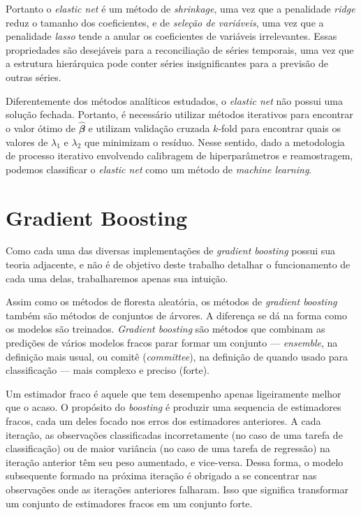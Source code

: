 \begin{apendicesenv}
Portanto o \emph{elastic net} é um método de \emph{shrinkage}, uma vez
que a penalidade \emph{ridge} reduz o tamanho dos coeficientes, e de
\emph{seleção de variáveis}, uma vez que a penalidade \emph{lasso} tende
a anular os coeficientes de variáveis irrelevantes. Essas propriedades
são desejáveis para a reconciliação de séries temporais, uma vez que a
estrutura hierárquica pode conter séries insignificantes para a previsão
de outras séries.

Diferentemente dos métodos analíticos estudados, o \emph{elastic net}
não possui uma solução fechada. Portanto, é necessário utilizar métodos
iterativos para encontrar o valor ótimo de \(\mathbfit{\hat{\beta}}\) e
\textcite{zou_regularization_2005} utilizam validação cruzada \(k\)-fold
para encontrar quais os valores de \(\lambda_1\) e \(\lambda_2\) que
minimizam o resíduo. Nesse sentido, dado a metodologia de processo
iterativo envolvendo calibragem de hiperparâmetros e reamostragem,
podemos classificar o \emph{elastic net} como um método de \emph{machine
learning}.

\section{Gradient Boosting}\label{gradient-boosting}

Como cada uma das diversas implementações de \emph{gradient boosting}
possui sua teoria adjacente, e não é de objetivo deste trabalho detalhar
o funcionamento de cada uma delas, trabalharemos apenas sua intuição.

Assim como os métodos de floresta aleatória, os métodos de
\emph{gradient boosting} também são métodos de conjuntos de árvores. A
diferença se dá na forma como os modelos são treinados. \emph{Gradient
boosting} são métodos que combinam as predições de vários modelos fracos
parar formar um conjunto --- \emph{ensemble}, na definição mais usual,
ou comitê (\emph{committee}), na definição de
\textcite{hastie_elements_2009} quando usado para classificação --- mais
complexo e preciso (forte).

Um estimador fraco é aquele que tem desempenho apenas ligeiramente
melhor que o acaso. O propósito do \emph{boosting} é produzir uma
sequencia de estimadores fracos, cada um deles focado nos erros dos
estimadores anteriores. A cada iteração, as observações classificadas
incorretamente (no caso de uma tarefa de classificação) ou de maior
variância (no caso de uma tarefa de regressão) na iteração anterior têm
seu peso aumentado, e vice-versa. Dessa forma, o modelo subsequente
formado na próxima iteração é obrigado a se concentrar nas observações
onde as iterações anteriores falharam. Isso que significa transformar um
conjunto de estimadores fracos em um conjunto forte.


\end{apendicesenv}
